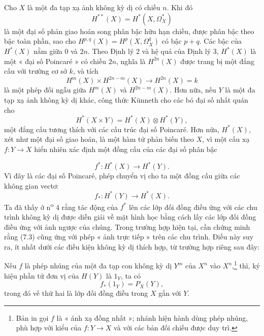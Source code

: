 
Cho $X$ là một đa tạp xạ ảnh không kỳ dị có chiều $n$. Khi đó
\[
  H^{**}(X)=H^{*}(X,\Omega_X^{*})
\]
là một đại số phản giao hoán song phân bậc hữu hạn chiều, được phân bậc
theo bậc toàn phần, sao cho $H^{p,q}(X)=H^{p}(X,\Omega_X^{q})$ có bậc
$p+q$. Các bậc của $H^{*}(X)$ nằm giữa $0$ và $2n$. Theo
Định lý 2 và hệ quả của Định lý 3, $H^{*}(X)$ là một « đại số
Poincaré » có chiều $2n$, nghĩa là $H^{2n}(X)$ được trang bị một đẳng cấu với
trường cơ sở $k$, và tích
\[
  H^{m}(X)\times H^{2n-m}(X)\longrightarrow H^{2n}(X)=k
\]
là một phép đối ngẫu giữa $H^{m}(X)$ và $H^{2n-m}(X)$. Hơn nữa, nếu $Y$ là một
đa tạp xạ ảnh không kỳ dị khác, công thức Künneth cho các
bó đại số nhất quán cho
\begin{equation}\tag{7.1}
  H^{*}(X\times Y)=H^{*}(X)\otimes H^{*}(Y),
\end{equation}
một đẳng cấu tương thích với các cấu trúc đại số Poincaré. Hơn nữa,
$H^{*}(X)$, xét như một đại số giao hoán, là một hàm tử phản biến theo
$X$, vì một cấu xạ $f:Y\longrightarrow X$ hiển nhiên xác định một
đồng cấu của các đại số phân bậc

\begin{equation}\tag{7.2}
  f^{*}:H^{*}(X)\longrightarrow H^{*}(Y).
\end{equation}
Vì đây là các đại số Poincaré, phép chuyển vị cho ta một đồng cấu giữa các
không gian vectơ:
\begin{equation}\tag{7.3}
  f_{*}:H^{*}(Y)\longrightarrow H^{*}(X).
\end{equation}
Ta đã thấy ở n\textsuperscript{o} 4 rằng tác động của $f^{*}$ lên các lớp đối đồng điều
ứng với các chu trình không kỳ dị được diễn giải về mặt hình học bằng cách
lấy các lớp đối đồng điều ứng với ảnh ngược của chúng. Trong trường hợp hiện
tại, cần chứng minh rằng (7.3) cũng ứng với phép « ảnh trực tiếp » trên các
chu trình. Điều này suy ra, ít nhất dưới các điều kiện không kỳ dị thích hợp,
từ trường hợp riêng sau đây:

 Nếu $f$ là phép nhúng của một đa tạp con không
kỳ dị $Y^{m}$ của $X^{n}$ vào $X^{n}$,\footnote{Bản in gọi $f$ là
« ánh xạ đồng nhất »; nhánh hiện hành dùng phép nhúng, phù hợp với kiểu của
$f:Y\longrightarrow X$ và với các bản đối chiếu được duy trì.} thì, ký hiệu
phần tử đơn vị của $H(Y)$ là $1_Y$, ta có
\begin{equation}\tag{7.4}
  f_{*}(1_Y)=P_X(Y),
\end{equation}
trong đó vế thứ hai là lớp đối đồng điều trong $X$ gắn với $Y$.

